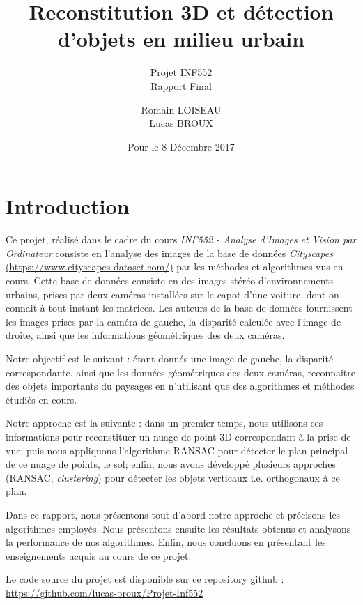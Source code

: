 \documentclass[titlepage,11pt,a4paper]{article}
\title[Projet INF552]{Reconstitution 3D et détection d’objets en milieu urbain}
\subtitle{Projet INF552 \\ Rapport Final}
\author{ Romain \textsc{LOISEAU}\\ Lucas \textsc{BROUX}}
\date{Pour le 8 Décembre 2017}
\begin{document}
\maketitle

\newpage 

\newpage \tableofcontents

\newpage \section{Introduction}
\par Ce projet, réalisé dans le cadre du cours \emph{INF552 - Analyse d'Images et Vision par Ordinateur} consiste en l'analyse des images de la base de données \emph{Cityscapes} \href{(https://www.cityscapes-dataset.com/)}{(https://www.cityscapes-dataset.com/)} par les méthodes et algorithmes vus en cours. Cette base de données consiste en des images stéréo d'environnements urbains, prises par deux caméras installées sur le capot d'une voiture, dont on connait à tout instant les matrices. Les auteurs de la base de données fournissent les images prises par la caméra de gauche, la disparité calculée avec l'image de droite, ainsi que les informations géométriques des deux caméras.
\par Notre objectif est le suivant : étant donnés une image de gauche, la disparité correspondante, ainsi que les données géométriques des deux caméras, reconnaitre des objets importants du paysages en n'utilisant que des algorithmes et méthodes étudiés en cours.
\par Notre approche est la suivante : dans un premier temps, nous utilisons ces informations pour reconstituer un nuage de point 3D correspondant à la prise de vue; puis nous appliquons l'algorithme RANSAC pour détecter le plan principal de ce nuage de points, le sol; enfin, nous avons développé plusieurs approches (RANSAC, \emph{clustering}) pour détecter les objets verticaux i.e. orthogonaux à ce plan.
\par Dans ce rapport, nous présentons tout d'abord notre approche et précisons les algorithmes employés. Nous présentons ensuite les résultats obtenus et analysons la performance de nos algorithmes. Enfin, nous concluons en présentant les enseignements acquis au cours de ce projet.
\par Le code source du projet est disponible sur ce repository github : \href{https://github.com/lucas-broux/Projet-Inf552}{https://github.com/lucas-broux/Projet-Inf552}
\end{document}
